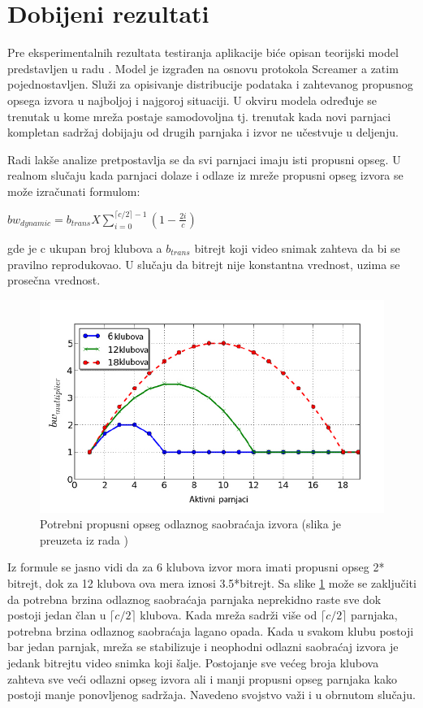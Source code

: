 \documentclass[12pt,oneside]{memoir}
\begin{document}
\section{Dobijeni rezultati}
\label{testiranja.1}
Pre eksperimentalnih rezultata testiranja aplikacije biće opisan teorijski model predstavljen u radu \cite{ClubbingWithThePeers}. Model je izgrađen na osnovu protokola Screamer a zatim pojednostavljen. Služi za opisivanje distribucije podataka i zahtevanog propusnog opsega izvora u najboljoj i najgoroj situaciji. U okviru modela određuje se trenutak u kome mreža postaje samodovoljna tj. trenutak kada novi parnjaci kompletan sadržaj dobijaju od drugih parnjaka i izvor ne učestvuje u deljenju. 

Radi lakše analize pretpostavlja se da svi parnjaci imaju isti propusni opseg. U realnom slučaju kada parnjaci dolaze i odlaze iz mreže propusni opseg izvora se može izračunati formulom:

$ bw_{dynamic} = b_{trans} X \sum_{i=0}^{ \lceil c/2 \rceil - 1} ( 1 - \frac{2i}{c}) $

gde je c ukupan broj klubova a $b_{trans}$ bitrejt koji video snimak zahteva da bi se pravilno reprodukovao. U slučaju da bitrejt nije konstantna vrednost, uzima se prosečna vrednost. 

\begin{figure}[!ht]
  \centering
  \includegraphics[width=1\textwidth]{slike/teorijski-model.jpg}
  \caption{Potrebni  propusni opseg odlaznog saobraćaja izvora (slika je preuzeta iz rada \cite{ClubbingWithThePeers})}
  \label{fig:teorijski-model}
\end{figure}
\par


Iz formule se jasno vidi da za 6 klubova izvor mora imati propusni opseg 2* bitrejt, dok za 12 klubova ova mera iznosi 3.5*bitrejt. Sa slike \ref{fig:teorijski-model} može se zaključiti da potrebna brzina odlaznog saobraćaja parnjaka neprekidno raste sve dok postoji jedan član u $ \lceil c/2 \rceil $ klubova. Kada mreža sadrži više od $ \lceil c/2 \rceil $ parnjaka, potrebna brzina odlaznog saobraćaja lagano opada. Kada u svakom klubu postoji bar jedan parnjak, mreža se stabilizuje i neophodni odlazni saobraćaj izvora je jedank bitrejtu video snimka koji šalje. Postojanje sve većeg broja klubova zahteva sve veći odlazni opseg izvora ali i manji propusni opseg parnjaka kako postoji manje ponovljenog sadržaja. Navedeno svojstvo važi i u obrnutom slučaju.
\end{document}
